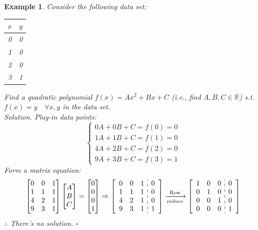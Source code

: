 \documentclass[12pt, a4paper]{article}
\newtheorem{eg}{Example}[subsection]
\newenvironment*{sol}{\indent\textit{Solution. }}{\hfill{$\square$}\par}
\def\R{{\mathbb{R}}}
\def\C{{\mathbb{C}}}
\begin{document}
\begin{eg}\label{eg5.3.2}
	Consider the following data set: 
	\begin{center}\begin{tabular}{c|c}$x$&$y$\\\hline0&0\\1&0\\2&0\\3&1\end{tabular}\end{center} Find a quadratic polynomial $f(x)=Ax^2+Bx+C$ (i.e., find $A,B,C\in\R$) \emph{s.t.} $f(x)=y\quad\forall x,y$ in the data set.\\ 
	\begin{sol}
		Plug-in data points: \[\begin{cases}0A+0B+C=f(0)=0\\1A+1B+C=f(1)=0\\4A+2B+C=f(2)=0\\9A+3B+C=f(3)=1\end{cases}\]
		Form a matrix equation: \[\begin{bmatrix}0&0&1\\1&1&1\\4&2&1\\9&3&1\end{bmatrix}\begin{bmatrix}A\\B\\C\end{bmatrix}=\begin{bmatrix}0\\0\\0\\1\end{bmatrix}\Rightarrow\left[\begin{array}{c:c}\begin{matrix}0&0&1\\1&1&1\\4&2&1\\9&3&1\end{matrix}&\begin{matrix}0\\0\\0\\1\end{matrix}\end{array}\right]\xrightarrow[\text{reduce}]{\text{Row}}\left[\begin{array}{c:c}\begin{matrix}1&0&0\\0&1&0\\0&0&1\\0&0&0\end{matrix}&\begin{matrix}0\\0\\0\\1\end{matrix}\end{array}\right]\]
		$\therefore$ There's no solution.
	\end{sol}
\end{eg}
\end{document}
